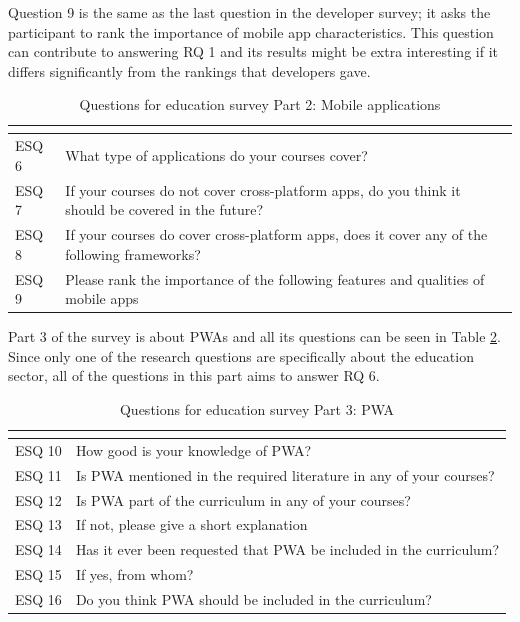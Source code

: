\documentclass[a4paper,12pt]{article}
\begin{document}
Question 9 is the same as the last question in the developer survey; it asks the participant to rank the importance of mobile app characteristics. This question can contribute to answering RQ 1 and its results might be extra interesting if it differs significantly from the rankings that developers gave.
\newpage

\begin{table}[ht]
\centering
{}
\begin{tabular}{|l|p{11cm}|}
\hline
\rowcolor[HTML]{656565}
\multicolumn{1}{|c|}{\cellcolor[HTML]{656565}{\color[HTML]{FFFFFF} Number}} & \multicolumn{1}{l|}{\cellcolor[HTML]{656565}{\color[HTML]{FFFFFF} Question}} \\ \hline
ESQ 6 & What type of applications do your courses cover? \\
ESQ 7 & If your courses do not cover cross-platform apps, do you think it should be covered in the future? \\
ESQ 8 & If your courses do cover cross-platform apps, does it cover any of the following frameworks? \\
ESQ 9 & Please rank the importance of the following features and qualities of mobile apps \\
\hline
\end{tabular}
\caption{Questions for education survey Part 2: Mobile applications}
\label{tab:eduq2}
\end{table}

Part 3 of the survey is about PWAs and all its questions can be seen in Table \ref{tab:eduq3}. Since only one of the research questions are specifically about the education sector, all of the questions in this part aims to answer RQ 6.

\begin{table}[ht]
\centering
{}
\begin{tabular}{|l|l|}
\hline
\rowcolor[HTML]{656565}
\multicolumn{1}{|c|}{\cellcolor[HTML]{656565}{\color[HTML]{FFFFFF} Number}} & \multicolumn{1}{l|}{\cellcolor[HTML]{656565}{\color[HTML]{FFFFFF} Question}} \\ \hline
ESQ 10 & How good is your knowledge of PWA? \\
ESQ 11 & Is PWA mentioned in the required literature in any of your courses? \\
ESQ 12 & Is PWA part of the curriculum in any of your courses? \\
ESQ 13 & If not, please give a short explanation \\
ESQ 14 & Has it ever been requested that PWA be included in the curriculum? \\
ESQ 15 & If yes, from whom? \\
ESQ 16 & Do you think PWA should be included in the curriculum? \\
\hline
\end{tabular}
\caption{Questions for education survey Part 3: PWA}
\label{tab:eduq3}
\end{table}
\end{document}
